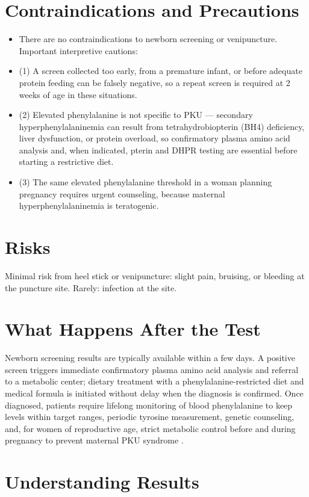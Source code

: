\section*{Contraindications and Precautions}
\begin{itemize}
  \item There are no contraindications to newborn screening or venipuncture. Important interpretive cautions:
  \item (1) A screen collected too early, from a premature infant, or before adequate protein feeding can be falsely negative, so a repeat screen is required at 2 weeks of age in these situations.
  \item (2) Elevated phenylalanine is not specific to PKU --- secondary hyperphenylalaninemia can result from tetrahydrobiopterin (BH4) deficiency, liver dysfunction, or protein overload, so confirmatory plasma amino acid analysis and, when indicated, pterin and DHPR testing are essential before starting a restrictive diet.
  \item (3) The same elevated phenylalanine threshold in a woman planning pregnancy requires urgent counseling, because maternal hyperphenylalaninemia is teratogenic.
\end{itemize}
\section*{Risks}
Minimal risk from heel stick or venipuncture: slight pain, bruising, or bleeding at the puncture site. Rarely: infection at the site.

\section*{What Happens After the Test}
Newborn screening results are typically available within a few days. A positive screen triggers immediate confirmatory plasma amino acid analysis and referral to a metabolic center; dietary treatment with a phenylalanine-restricted diet and medical formula is initiated without delay when the diagnosis is confirmed. Once diagnosed, patients require lifelong monitoring of blood phenylalanine to keep levels within target ranges, periodic tyrosine measurement, genetic counseling, and, for women of reproductive age, strict metabolic control before and during pregnancy to prevent maternal PKU syndrome \cite{blau2010phenylketonuria}.

\section*{Understanding Results}

